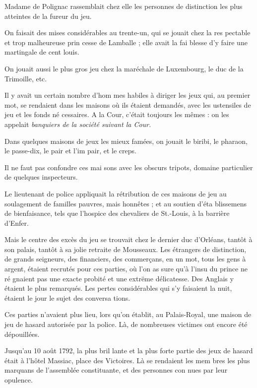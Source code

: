 Madame de Polignac rassemblait
chez elle les personnes de distinction
les plus atteintes de la fureur du jeu.

On faisait des mises considérables
au trente-un, qui se jouait chez la res%
pectable et trop malheureuse prin%
cesse de Lamballe ; elle avait la fai%
blesse d'y faire une martingale de cent
louis.

On jouait aussi le plus gros jeu chez
la maréchale de Luxembourg, le duc
de la Trimoille, etc.

Il y avait un certain nombre d'hom%
mes habiles à diriger les jeux qui, au
premier mot, se rendaient dans les
maisons où ils étaient demandés, avec
les ustensiles de jeu et les fonds né%
cessaires. A la Cour, c'était toujours
les mêmes : on les appelait \emph{banquiers
de la société suivant la Cour.}

Dans quelques maisons de jeux les
mieux famées, on jouait le biribi, le
pharaon, le passe-dix, le pair et l'im%
pair, et le creps.

Il ne faut pas confondre ces mai%
sons avec les obscurs tripots, domaine
particulier de quelques inspecteurs.

Le lieutenant de police appliquait
la rétribution de ces maisons de jeu
au soulagement de familles pauvres,
mais honnêtes ; et au soutien d'éta%
blissemens de bienfaisance, tels que
l'hospice des chevaliers de St.-Louis,
à la barrière d'Enfer.

Mais le centre des excès du jeu se
trouvait chez le dernier duc d'Orléans,
tantôt à son palais, tantôt à sa jolie
retraite de Mousseaux. Les étrangers
de distinction, de grands seigneurs,
des financiers, des commerçans, en
un mot, tous les gens à argent, étaient
recrutés pour ces parties, où l'on as%
sure qu'à l'insu du prince ne ré%
gnaient pas une exacte probité et une
extrëme délicatesse. Des Anglais y
étaient le plus remarqués. Les pertes
considérables qui s'y faisaient la nuit,
étaient le jour le sujet des conversa%
tions.

Ces parties n'avaient plus lieu, lors%
qu'on établit, au Palais-Royal, une
maison de jeu de hasard autorisée par
la police. Là, de nombreuses victimes
ont encore été dépouillées.

Jusqu'au 10 août 1792, la plus bril%
lante et la plus forte partie des jeux de
hasard était à l'hôtel Massiac, place
des Victoires. Là se rendaient les mem%
bres les plus marquans de l'assemblée
constituante, et des personnes con%
nues par leur opulence.

